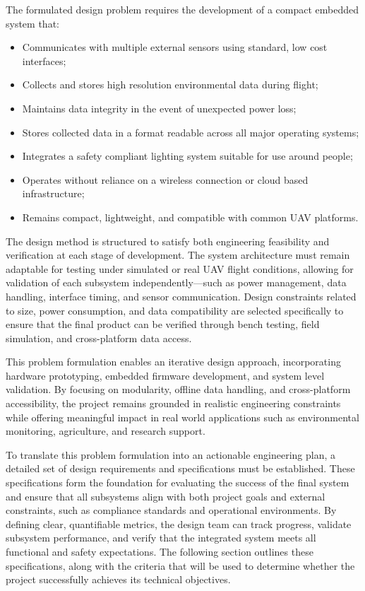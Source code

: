 \documentclass[12pt]{article}
\begin{document}
\par The formulated design problem requires the development of a compact embedded system that:
\begin{itemize}
    \item Communicates with multiple external sensors using standard, low cost interfaces;
    \item Collects and stores high resolution environmental data during flight;
    \item Maintains data integrity in the event of unexpected power loss;
    \item Stores collected data in a format readable across all major operating systems;
    \item Integrates a safety compliant lighting system suitable for use around people;
    \item Operates without reliance on a wireless connection or cloud based infrastructure;
    \item Remains compact, lightweight, and compatible with common UAV platforms.
\end{itemize}

\par The design method is structured to satisfy both engineering feasibility and verification at each stage of development. The system architecture must remain adaptable for testing under simulated or real UAV flight conditions, allowing for validation of each subsystem independently—such as power management, data handling, interface timing, and sensor communication. Design constraints related to size, power consumption, and data compatibility are selected specifically to ensure that the final product can be verified through bench testing, field simulation, and cross-platform data access.

\par This problem formulation enables an iterative design approach, incorporating hardware prototyping, embedded firmware development, and system level validation. By focusing on modularity, offline data handling, and cross-platform accessibility, the project remains grounded in realistic engineering constraints while offering meaningful impact in real world applications such as environmental monitoring, agriculture, and research support.
\par To translate this problem formulation into an actionable engineering plan, a detailed set of design requirements and specifications must be established. These specifications form the foundation for evaluating the success of the final system and ensure that all subsystems align with both project goals and external constraints, such as compliance standards and operational environments. By defining clear, quantifiable metrics, the design team can track progress, validate subsystem performance, and verify that the integrated system meets all functional and safety expectations. The following section outlines these specifications, along with the criteria that will be used to determine whether the project successfully achieves its technical objectives.
\end{document}
